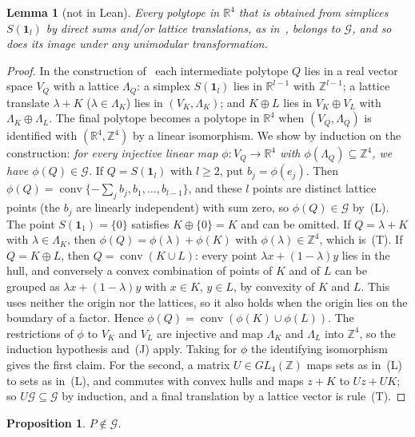 \documentclass[11pt]{article}
\newtheorem{lemma}{Lemma}
\newtheorem{proposition}{Proposition}
\theoremstyle{definition}
\theoremstyle{remark}
\newcommand{\R}{\mathbb R}
\newcommand{\Z}{\mathbb Z}
\newcommand{\one}{\mathbf 1}
\newcommand{\conv}{\operatorname{conv}}
\newcommand{\G}{\mathcal G}
\begin{document}
\begin{lemma}[not in Lean]\label{lem:G}
Every polytope in $\R^4$ that is obtained from simplices $S(\one_l)$ by direct
sums and/or lattice translations, as in~\cite{css}, belongs to $\G$, and so
does its image under any unimodular transformation.
\end{lemma}

\begin{proof}
In the construction of~\cite{css} each intermediate polytope $Q$ lies in a
real vector space $V_Q$ with a lattice $\Lambda_Q$: a simplex $S(\one_l)$
lies in $\R^{l-1}$ with $\Z^{l-1}$; a lattice translate $\lambda+K$
($\lambda\in\Lambda_K$) lies in $(V_K,\Lambda_K)$; and $K\oplus L$ lies in
$V_K\oplus V_L$ with $\Lambda_K\oplus\Lambda_L$. The final polytope becomes a
polytope in $\R^4$ when $(V_Q,\Lambda_Q)$ is identified with $(\R^4,\Z^4)$ by
a linear isomorphism. We show by induction on the construction: \emph{for
every injective linear map $\phi\colon V_Q\to\R^4$ with
$\phi(\Lambda_Q)\subseteq\Z^4$, we have $\phi(Q)\in\G$.} If $Q=S(\one_l)$
with $l\ge2$, put $b_j=\phi(e_j)$. Then
$\phi(Q)=\conv\{-\sum_jb_j,b_1,\dots,b_{l-1}\}$, and these $l$ points are
distinct lattice points (the $b_j$ are linearly independent) with sum zero,
so $\phi(Q)\in\G$ by~(L). The point $S(\one_1)=\{0\}$ satisfies
$K\oplus\{0\}=K$ and can be omitted. If $Q=\lambda+K$ with
$\lambda\in\Lambda_K$, then $\phi(Q)=\phi(\lambda)+\phi(K)$ with
$\phi(\lambda)\in\Z^4$, which is~(T). If $Q=K\oplus L$, then
$Q=\conv(K\cup L)$: every point $\lambda x+(1-\lambda)y$ lies in the hull,
and conversely a convex combination of points of $K$ and of $L$ can be
grouped as $\lambda x+(1-\lambda)y$ with $x\in K$, $y\in L$, by convexity of
$K$ and $L$. This uses neither the origin nor the lattices, so it also holds
when the origin lies on the boundary of a factor. Hence
$\phi(Q)=\conv(\phi(K)\cup\phi(L))$. The restrictions of $\phi$ to $V_K$ and
$V_L$ are injective and map $\Lambda_K$ and $\Lambda_L$ into $\Z^4$, so the
induction hypothesis and~(J) apply. Taking for $\phi$ the identifying
isomorphism gives the first claim. For the second, a matrix $U\in GL_4(\Z)$ maps sets as in~(L) to
sets as in~(L), and commutes with convex hulls and maps $z+K$ to $Uz+UK$; so
$U\G\subseteq\G$ by induction, and a final translation by a lattice vector is
rule~(T).
\end{proof}

\begin{proposition}\label{prop:outside}
$P\notin\G$.
\end{proposition}
\end{document}
